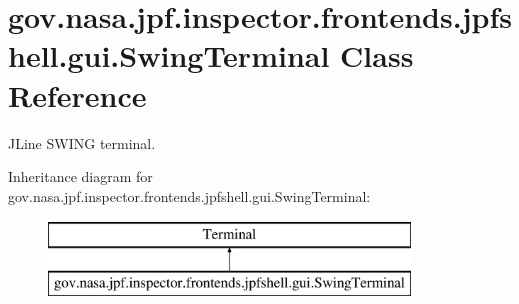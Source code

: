 \hypertarget{classgov_1_1nasa_1_1jpf_1_1inspector_1_1frontends_1_1jpfshell_1_1gui_1_1_swing_terminal}{}\section{gov.\+nasa.\+jpf.\+inspector.\+frontends.\+jpfshell.\+gui.\+Swing\+Terminal Class Reference}
\label{classgov_1_1nasa_1_1jpf_1_1inspector_1_1frontends_1_1jpfshell_1_1gui_1_1_swing_terminal}


J\+Line S\+W\+I\+NG terminal.  


Inheritance diagram for gov.\+nasa.\+jpf.\+inspector.\+frontends.\+jpfshell.\+gui.\+Swing\+Terminal\+:\begin{figure}[H]
\begin{center}
\leavevmode
\includegraphics[height=2.000000cm]{classgov_1_1nasa_1_1jpf_1_1inspector_1_1frontends_1_1jpfshell_1_1gui_1_1_swing_terminal}
\end{center}
\end{figure}

